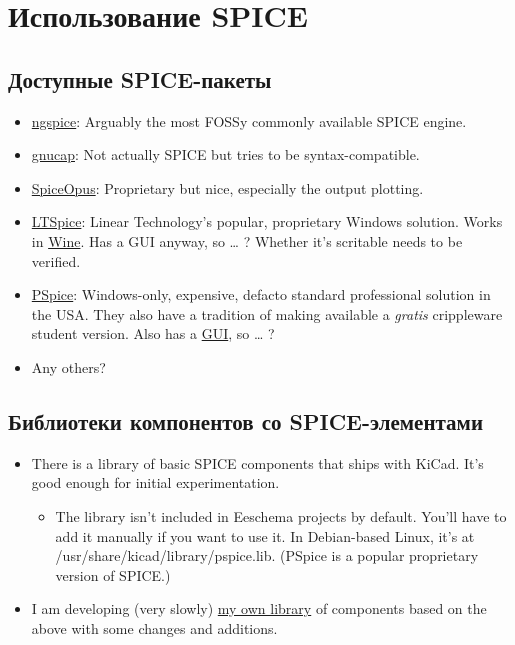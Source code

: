 
\section{Использование SPICE}

\subsection{Доступные SPICE-пакеты}

\begin{itemize}
\item \href{http://ngspice.sourceforge.net/}{ngspice}: Arguably the most FOSSy
commonly available SPICE engine.
\item
\href{https://www.gnu.org/software/gnucap/}{gnucap}:
Not actually SPICE but tries to be syntax-compatible.
\item \href{http://www.spiceopus.si/}{SpiceOpus}: Proprietary but nice,
especially the output plotting.
\item \href{http://www.linear.com/designtools/software/}{LTSpice}: Linear
Technology's popular, proprietary Windows solution.
Works in \href{http://www.winehq.org/}{Wine}. Has a GUI anyway, so … ? Whether
it's scritable needs to be verified.
\item
\href{http://www.cadence.com/products/orcad/pspice_simulation/Pages/default.aspx}{PSpice}:
Windows-only, expensive, defacto standard professional solution in the USA. They
also have a tradition of making available a \emph{gratis} crippleware student
version.
Also has a \underline{GUI}, so … ?
\item Any others?
\end{itemize}

\subsection{Библиотеки компонентов со SPICE-элементами}

\begin{itemize}

\item There is a library of basic SPICE components that ships with KiCad. It's
good enough for initial experimentation.

\begin{itemize}
\item The library isn't included in Eeschema projects by default. You'll have to
add it manually if you want to use it.
In Debian-based Linux, it's at \\/usr/share/kicad/library/pspice.lib. (PSpice is
a popular proprietary version of SPICE.)
\end{itemize}

\item I am developing (very slowly)
\href{https://bitbucket.org/mithat/kicad-spice-library}{my own
library}
of components based on the above with some changes and additions.

\end{itemize}

